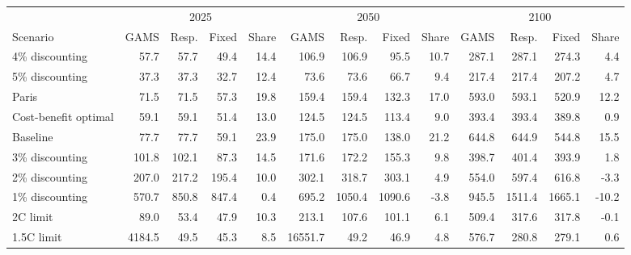 \begin{tabular}{lrrrrrrrrrrrr}
\toprule
 & \multicolumn{4}{c}{2025} & \multicolumn{4}{c}{2050} & \multicolumn{4}{c}{2100} \\
\cmidrule(lr){2-5}\cmidrule(lr){6-9}\cmidrule(lr){10-13}
Scenario & GAMS & Resp. & Fixed & Share & GAMS & Resp. & Fixed & Share & GAMS & Resp. & Fixed & Share \\
\midrule
4\% discounting & 57.7 & 57.7 & 49.4 & 14.4 & 106.9 & 106.9 & 95.5 & 10.7 & 287.1 & 287.1 & 274.3 & 4.4 \\
5\% discounting & 37.3 & 37.3 & 32.7 & 12.4 & 73.6 & 73.6 & 66.7 & 9.4 & 217.4 & 217.4 & 207.2 & 4.7 \\
Paris & 71.5 & 71.5 & 57.3 & 19.8 & 159.4 & 159.4 & 132.3 & 17.0 & 593.0 & 593.1 & 520.9 & 12.2 \\
Cost-benefit optimal & 59.1 & 59.1 & 51.4 & 13.0 & 124.5 & 124.5 & 113.4 & 9.0 & 393.4 & 393.4 & 389.8 & 0.9 \\
Baseline & 77.7 & 77.7 & 59.1 & 23.9 & 175.0 & 175.0 & 138.0 & 21.2 & 644.8 & 644.9 & 544.8 & 15.5 \\
3\% discounting & 101.8 & 102.1 & 87.3 & 14.5 & 171.6 & 172.2 & 155.3 & 9.8 & 398.7 & 401.4 & 393.9 & 1.8 \\
2\% discounting & 207.0 & 217.2 & 195.4 & 10.0 & 302.1 & 318.7 & 303.1 & 4.9 & 554.0 & 597.4 & 616.8 & -3.3 \\
1\% discounting & 570.7 & 850.8 & 847.4 & 0.4 & 695.2 & 1050.4 & 1090.6 & -3.8 & 945.5 & 1511.4 & 1665.1 & -10.2 \\
2\textdegree{}C limit & 89.0 & 53.4 & 47.9 & 10.3 & 213.1 & 107.6 & 101.1 & 6.1 & 509.4 & 317.6 & 317.8 & -0.1 \\
1.5\textdegree{}C limit & 4184.5 & 49.5 & 45.3 & 8.5 & 16551.7 & 49.2 & 46.9 & 4.8 & 576.7 & 280.8 & 279.1 & 0.6 \\
\bottomrule
\end{tabular}
